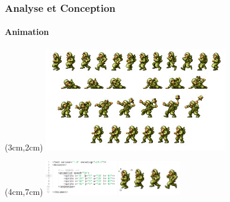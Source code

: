 \begin{frame}

	\frametitle{Analyse et Conception}
	\framesubtitle{Animation}

	\begin{textblock*}{3cm}(3cm,2cm)
		\includegraphics[width=8cm]{figures/partie_feuille_sprite.jpg}
	\end{textblock*}

	\begin{textblock*}{3cm}(4cm,7cm)
		\includegraphics[width=6cm]{figures/xml_anim.png}
	\end{textblock*}

\end{frame}